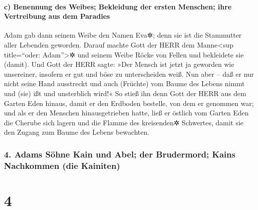 \hypertarget{c-benennung-des-weibes-bekleidung-der-ersten-menschen-ihre-vertreibung-aus-dem-paradies}{%
\paragraph{c) Benennung des Weibes; Bekleidung der ersten Menschen; ihre
Vertreibung aus dem
Paradies}\label{c-benennung-des-weibes-bekleidung-der-ersten-menschen-ihre-vertreibung-aus-dem-paradies}}

 Adam gab dann seinem Weibe den Namen Eva✲; denn sie ist
die Stammutter aller Lebenden geworden.  Darauf machte
Gott der HERR dem Manne\textless sup title=``oder: Adam''\textgreater✲
und seinem Weibe Röcke von Fellen und bekleidete sie (damit).
 Und Gott der HERR sagte: »Der Mensch ist jetzt ja
geworden wie unsereiner, insofern er gut und böse zu unterscheiden weiß.
Nun aber -- daß er nur nicht seine Hand ausstreckt und auch (Früchte)
vom Baume des Lebens nimmt und (sie) ißt und unsterblich wird!«
 So stieß ihn denn Gott der HERR aus dem Garten Eden
hinaus, damit er den Erdboden bestelle, von dem er genommen war;
 und als er den Menschen hinausgetrieben hatte, ließ er
östlich vom Garten Eden die Cherube sich lagern und die Flamme des
kreisenden✲ Schwertes, damit sie den Zugang zum Baume des Lebens
bewachten.

\hypertarget{adams-suxf6hne-kain-und-abel-der-brudermord-kains-nachkommen-die-kainiten}{%
\subsubsection{4. Adams Söhne Kain und Abel; der Brudermord; Kains
Nachkommen (die
Kainiten)}\label{adams-suxf6hne-kain-und-abel-der-brudermord-kains-nachkommen-die-kainiten}}

\hypertarget{section-3}{%
\section{4}\label{section-3}}


